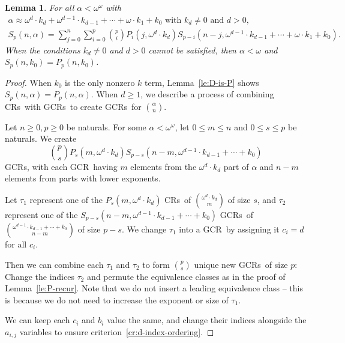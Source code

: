 \documentclass[11pt]{article}
\newcommand{\om}{\omega}
\newcommand{\oequiv}{\approx}
\newcommand{\crulenospace}{CR}
\newcommand{\crules}{\crulenospace s~}
\newcommand{\gencrulenospace}{GCR}
\newcommand{\gencrule}{\gencrulenospace~}
\newcommand{\gencrules}{\gencrulenospace s~}
\newcommand{\gencrulesnospace}{\gencrulenospace s}
\newcommand{\numpoints}{n}
\newcommand{\inumpoints}{i}
\newcommand{\idegr}{j}
\newcommand{\commonconst}{a}
\newcommand{\rareconst}{b}
\theoremstyle{plain}
\newtheorem{lemma}[theorem]{Lemma}
\theoremstyle{definition}
\begin{document}
\begin{lemma}
    \label{le:D-recur}
    For all $\alpha < \om^\om$ with \begin{align*}	\alpha \oequiv \om^d \cdot k_d + \om^{d-1} \cdot k_{d-1} + \cdots + \om \cdot k_1 + k_0 \text{ with } k_d \neq 0 \text{ and } d > 0,~~~~~~~~~\\
        S_p\left(\numpoints, \alpha\right) = \sum_{j=0}^{\numpoints} \sum_{i=0}^p \binom{p}{i} P_i\left(j, \om^d \cdot k_d \right) S_{p-i}\left(\numpoints-j, \om^{d-1} \cdot k_{d-1} + \cdots + \om \cdot k_1 + k_0\right).
     \end{align*}
     When the conditions $k_d \neq 0$ and $d > 0$ cannot be satisfied, then $\alpha < \om$ and $S_p(\numpoints, k_0) = P_p(\numpoints, k_0)$.
\end{lemma}
\begin{proof}
When $k_0$ is the only nonzero $k$ term, Lemma~\ref{le:D-is-P} shows $S_p(\numpoints, \alpha) = P_p(\numpoints, \alpha)$. When $d \geq 1$, we describe a process of combining \crules with \gencrules to create \gencrules for $\binom{\alpha}{\numpoints}$.

Let $\numpoints \geq 0, p \geq 0$ be naturals. For some $\alpha < \om^\om$, let $0 \leq m \leq \numpoints$ and $0 \leq s \leq p$ be naturals. We create $$\binom{p}{s} P_s \left( m,\om^{d} \cdot k_d \right) S_{p-s} \left( \numpoints-m,\om^{d-1} \cdot k_{d-1} + \cdots + k_0\right)$$ \gencrulesnospace, with each \gencrule having $m$ elements from the $\om^d  \cdot k_d$ part of $\alpha$ and $\numpoints-m$ elements from parts with lower exponents.

Let $\tau_1$ represent one of the $P_s\left(m, \om^{d} \cdot k_d\right)$ \crules of $\binom{\om^{d}\cdot k_d}{m}$ of size $s$, and $\tau_2$ represent one of the $S_{p-s}\left(\numpoints-m, \om^{d-1} \cdot k_{d-1} + \cdots + k_0\right)$ \gencrules of $\binom{\om^{d-1} \cdot k_{d-1} + \cdots + k_0}{\numpoints-m}$ of size $p-s$. We change $\tau_1$ into a \gencrule by assigning it $c_{\inumpoints} = d$ for all $c_{\inumpoints}$.

Then we can combine each $\tau_1$ and $\tau_2$ to form $\binom{p}{s}$ unique new \gencrules of size $p$: Change the indices $\tau_2$ and permute the equivalence classes as in the proof of Lemma~\ref{le:P-recur}. Note that we do not insert a leading equivalence class -- this is because we do not need to increase the exponent or size of $\tau_1$.

We can keep each $c_{\inumpoints}$ and $\rareconst_{\inumpoints}$ value the same, and change their indices alongside the $\commonconst_{\inumpoints,\idegr}$ variables to ensure criterion~\ref{cr:d-index-ordering}.


\end{proof}
\end{document}
